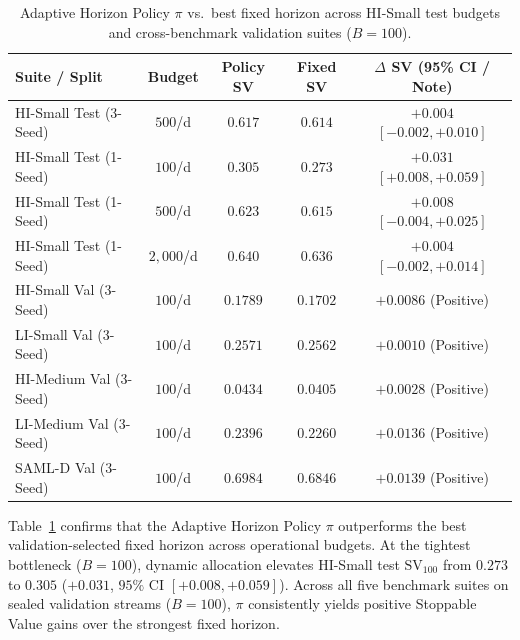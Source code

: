 \documentclass[sigconf,nonacm]{acmart}
\begin{document}
\begin{table}[t]
\centering
\caption{Adaptive Horizon Policy $\pi$ vs.\ best fixed horizon across HI-Small test budgets and cross-benchmark validation suites ($B = 100$).}
\label{tab:policy_results}
\scriptsize
\setlength{\tabcolsep}{2.4pt}
\begin{tabular}{lcccc}
\toprule
\textbf{Suite / Split} & \textbf{Budget} & \textbf{Policy SV} & \textbf{Fixed SV} & \textbf{$\Delta$ SV (95\% CI / Note)} \\
\midrule
HI-Small Test (3-Seed) & $500$/d & $0.617$ & $0.614$ & $+0.004$ $[-0.002, +0.010]$ \\
HI-Small Test (1-Seed) & $100$/d & $0.305$ & $0.273$ & $+0.031$ $[+0.008, +0.059]$ \\
HI-Small Test (1-Seed) & $500$/d & $0.623$ & $0.615$ & $+0.008$ $[-0.004, +0.025]$ \\
HI-Small Test (1-Seed) & $2{,}000$/d & $0.640$ & $0.636$ & $+0.004$ $[-0.002, +0.014]$ \\
\midrule
HI-Small Val (3-Seed) & $100$/d & $0.1789$ & $0.1702$ & $+0.0086$ (Positive) \\
LI-Small Val (3-Seed) & $100$/d & $0.2571$ & $0.2562$ & $+0.0010$ (Positive) \\
HI-Medium Val (3-Seed) & $100$/d & $0.0434$ & $0.0405$ & $+0.0028$ (Positive) \\
LI-Medium Val (3-Seed) & $100$/d & $0.2396$ & $0.2260$ & $+0.0136$ (Positive) \\
SAML-D Val (3-Seed) & $100$/d & $0.6984$ & $0.6846$ & $+0.0139$ (Positive) \\
\bottomrule
\end{tabular}
\end{table}

Table~\ref{tab:policy_results} confirms that the Adaptive Horizon Policy $\pi$ outperforms the best validation-selected fixed horizon across operational budgets. At the tightest bottleneck ($B = 100$), dynamic allocation elevates HI-Small test $\text{SV}_{100}$ from $0.273$ to $0.305$ ($+0.031$, $95\%$ CI $[+0.008, +0.059]$). Across all five benchmark suites on sealed validation streams ($B = 100$), $\pi$ consistently yields positive Stoppable Value gains over the strongest fixed horizon.
\end{document}
